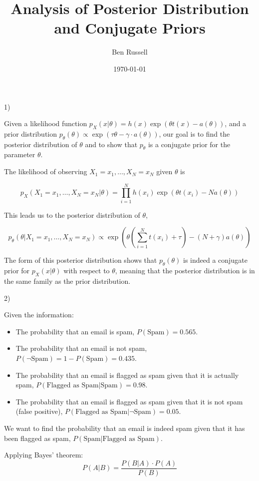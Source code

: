 \documentclass[12pt]{article}
\title{Analysis of Posterior Distribution and Conjugate Priors}
\author{Ben Russell}
\date{\today}
\begin{document}
\maketitle

1) 

Given a likelihood function \(p_{X}(x|\theta) = h(x) \exp (\theta t(x) - a(\theta))\), and a prior distribution \(p_{\theta}(\theta) \propto \exp(\tau \theta - \gamma \cdot a(\theta))\), our goal is to find the posterior distribution of \(\theta\) and to show that \(p_{\theta}\) is a conjugate prior for the parameter \(\theta\).

The likelihood of observing \(X_1 = x_1, \ldots, X_N = x_N\) given \(\theta\) is

\[
p_{X} (X_1 = x_1, \ldots, X_N = x_N | \theta) = \prod_{i=1}^{N} h(x_i) \exp (\theta t(x_i) - N a(\theta))
\]

This leads us to the posterior distribution of \(\theta\), 

\[
p_{\theta}(\theta | X_1 = x_1, \ldots, X_N = x_N) \propto \exp\left(\theta \left(\sum_{i=1}^{N} t(x_i) + \tau \right) - (N + \gamma) a(\theta)\right)
\]

The form of this posterior distribution shows that \(p_{\theta}(\theta)\) is indeed a conjugate prior for \(p_{X}(x|\theta)\) with respect to \(\theta\), meaning that the posterior distribution is in the same family as the prior distribution.

2)

Given the information:
\begin{itemize}
    \item The probability that an email is spam, $P(\text{Spam}) = 0.565$.
    \item The probability that an email is not spam, $P(\neg\text{Spam}) = 1 - P(\text{Spam}) = 0.435$.
    \item The probability that an email is flagged as spam given that it is actually spam, $P(\text{Flagged as Spam}|\text{Spam}) = 0.98$.
    \item The probability that an email is flagged as spam given that it is not spam (false positive), $P(\text{Flagged as Spam}|\neg\text{Spam}) = 0.05$.
\end{itemize}

We want to find the probability that an email is indeed spam given that it has been flagged as spam, $P(\text{Spam}|\text{Flagged as Spam})$.

Applying Bayes' theorem:
\[P(A|B) = \frac{P(B|A) \cdot P(A)}{P(B)}\]
\end{document}
